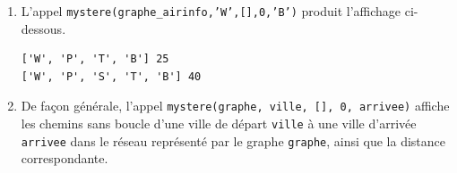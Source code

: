 \documentclass[11pt,a4paper]{article}
\newcommand{\mip}[1]{\texttt{#1}}
\begin{document}
\begin{enumerate}[resume]
\begin{verbatim}
def est_connexe(graphe):
    """Vérifie si un graphe est connexe."""
    depart=ville_arbitraire(graphe)
    visitees=[]
    parcours(graphe,visitees,depart)
    return len(visitees)==len(graphe)
\end{verbatim}

\item L'appel \mip{mystere(graphe_airinfo,'W',[],0,'B')} produit l'affichage ci-dessous.

\begin{verbatim}
['W', 'P', 'T', 'B'] 25
['W', 'P', 'S', 'T', 'B'] 40
\end{verbatim}


\item De façon générale, l’appel \mip{mystere(graphe,
ville, [], 0, arrivee)} affiche les chemins sans boucle d'une ville de départ \mip{ville} à une ville d'arrivée \mip{arrivee} dans le réseau représenté par le graphe \mip{graphe}, ainsi que la distance correspondante.
\end{enumerate}
\end{document}
